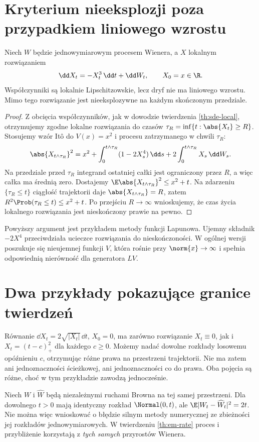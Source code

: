 \section{Kryterium nieeksplozji poza przypadkiem liniowego wzrostu}
\begin{twierdzenie}
\label{th:lyapunov-example}
Niech $W$ będzie jednowymiarowym procesem Wienera,
a $X$ lokalnym rozwiązaniem
\[
\dd X_t=-X_t^3\,\dd t+\dd W_t,\qquad X_0=x\in\R.
\]
Współczynniki są lokalnie Lipschitzowskie, lecz dryf
nie ma liniowego wzrostu. Mimo tego rozwiązanie jest
nieeksplozywne na każdym skończonym przedziale.
\end{twierdzenie}
\begin{proof}
Z obcięcia współczynników, jak w dowodzie twierdzenia
\ref{th:sde-local}, otrzymujemy zgodne lokalne
rozwiązania do czasów $\tau_R=\inf\{t:\abs{X_t}\ge R\}$.
Stosujemy wzór Itô do $V(x)=x^2$ i procesu
zatrzymanego w chwili $\tau_R$:
\[
\abs{X_{t\wedge\tau_R}}^2
=x^2+\int_0^{t\wedge\tau_R}(1-2X_s^4)\,\dd s
+2\int_0^{t\wedge\tau_R}X_s\,\dd W_s.
\]
Na przedziale przed $\tau_R$ integrand ostatniej
całki jest ograniczony przez $R$, a więc całka
ma średnią zero. Dostajemy
$\E\abs{X_{t\wedge\tau_R}}^2\le x^2+t$.
Na zdarzeniu $\{\tau_R\le t\}$ ciągłość trajektorii
daje $\abs{X_{t\wedge\tau_R}}=R$, zatem
$R^2\Prob(\tau_R\le t)\le x^2+t$.
Po przejściu $R\to\infty$ wnioskujemy, że czas
życia lokalnego rozwiązania jest nieskończony
prawie na pewno.
\end{proof}

\begin{uwaga}
Powyższy argument jest przykładem metody funkcji
Lapunowa. Ujemny składnik $-2X^4$ przeciwdziała
ucieczce rozwiązania do nieskończoności. W ogólnej
wersji poszukuje się nieujemnej funkcji $V$, która
rośnie przy $\norm{x}\to\infty$ i spełnia odpowiednią
nierówność dla generatora $LV$.
\end{uwaga}

\section{Dwa przykłady pokazujące granice twierdzeń}
\begin{przyklad}
Równanie $\dd X_t=2\sqrt{|X_t|}\,\dd t$, $X_0=0$,
ma zarówno rozwiązanie $X_t\equiv0$, jak i
$X_t=(t-c)_+^2$ dla każdego $c\ge0$.
Możemy nadać dowolne rozkłady losowemu opóźnieniu $c$,
otrzymując różne prawa na przestrzeni trajektorii.
Nie ma zatem ani jednoznaczności ścieżkowej, ani
jednoznaczności co do prawa. Oba pojęcia są różne,
choć w tym przykładzie zawodzą jednocześnie.
\end{przyklad}
\begin{przyklad}
Niech $W$ i $\widehat W$ będą niezależnymi ruchami Browna
na tej samej przestrzeni. Dla dowolnego $t>0$ mają identyczny
rozkład $\Normal(0,t)$, ale
$\E|W_t-\widehat W_t|^2=2t$.
Nie można więc wnioskować o błędzie silnym metody
numerycznej ze zbieżności jej rozkładów jednowymiarowych.
W twierdzeniu \ref{th:em-rate} proces i przybliżenie
korzystają z \emph{tych samych} przyrostów Wienera.
\end{przyklad}

